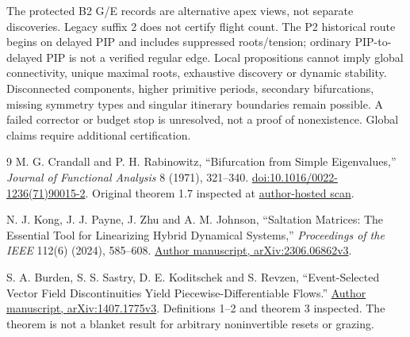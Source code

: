\documentclass[11pt]{article}
\begin{document}
The protected B2 G/E records are alternative apex views, not separate
discoveries. Legacy suffix 2 does not certify flight count. The P2 historical
route begins on delayed PIP and includes suppressed roots/tension; ordinary
PIP-to-delayed PIP is not a verified regular edge. Local propositions cannot
imply global connectivity, unique maximal roots, exhaustive discovery or
dynamic stability. Disconnected components, higher primitive periods,
secondary bifurcations, missing symmetry types and singular itinerary
boundaries remain possible. A failed corrector or budget stop is unresolved,
not a proof of nonexistence. Global claims require additional certification.

\begin{thebibliography}{9}
M. G. Crandall and P. H. Rabinowitz,
``Bifurcation from Simple Eigenvalues,''
\emph{Journal of Functional Analysis} 8 (1971), 321--340.
\href{https://doi.org/10.1016/0022-1236(71)90015-2}{doi:10.1016/0022-1236(71)90015-2}.
Original theorem 1.7 inspected at
\href{https://jxshix.people.wm.edu/2013-taiwan/crandall-rabinowitz-1971-JFA.pdf}{author-hosted scan}.

N. J. Kong, J. J. Payne, J. Zhu and A. M. Johnson,
``Saltation Matrices: The Essential Tool for Linearizing Hybrid Dynamical
Systems,'' \emph{Proceedings of the IEEE} 112(6) (2024), 585--608.
\href{https://arxiv.org/html/2306.06862v3}{Author manuscript, arXiv:2306.06862v3}.

S. A. Burden, S. S. Sastry, D. E. Koditschek and S. Revzen,
``Event-Selected Vector Field Discontinuities Yield Piecewise-Differentiable
Flows.''
\href{https://arxiv.org/html/1407.1775v3}{Author manuscript, arXiv:1407.1775v3}.
Definitions 1--2 and theorem 3 inspected. The theorem is not a blanket result
for arbitrary noninvertible resets or grazing.
\end{thebibliography}
\end{document}
